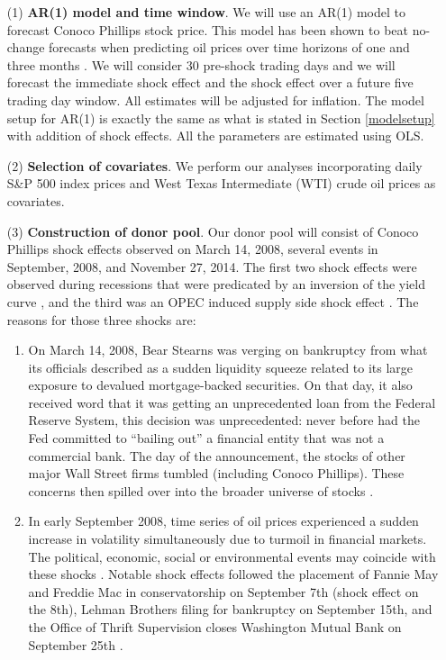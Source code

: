 \documentclass[11pt]{article}
\theoremstyle{definition}
\begin{document}
\begin{enumerate}
\item[(1)] {\bf AR(1) model and time window}. We will use an AR(1) model to forecast Conoco Phillips stock price. This model has been shown to beat no-change forecasts when predicting oil prices over time horizons of one and three months \citep{alquist2013forecasting}. We will consider 30 pre-shock trading days and we will forecast the immediate shock effect and the shock effect over a future five trading day window. All estimates will be adjusted for inflation. The model setup for AR(1) is exactly the same as what is stated in Section \ref{modelsetup} with addition of shock effects. All the parameters are estimated using OLS.
\item[(2)] {\bf Selection of covariates}. We perform our analyses incorporating daily S\&P 500 index prices and West Texas Intermediate (WTI) crude oil prices as covariates. 
\item[(3)] {\bf Construction of donor pool}. Our donor pool will consist of Conoco Phillips shock effects observed on March 14, 2008, several events in September, 2008, and November 27, 2014. The first two shock effects were observed during recessions that were predicated by an inversion of the yield curve \citep{bauer2018economic}, and the third was an OPEC induced supply side shock effect \citep{huppmann2015opec}. The reasons for those three shocks are:
  \begin{enumerate}
  \item On March 14, 2008, Bear Stearns was verging on bankruptcy from what its officials described as a sudden liquidity squeeze related to its large exposure to devalued mortgage-backed securities. On that day, it also received word that it was getting an unprecedented loan from the Federal Reserve System, this decision was unprecedented: never before had the Fed committed to ``bailing out'' a financial entity that was not a commercial bank. The day of the announcement, the stocks of other major Wall Street firms tumbled (including Conoco Phillips). These concerns then spilled over into the broader universe of stocks \citep{shorter2008bear}. %
  \item  In early September 2008, time series of oil prices experienced a sudden increase in volatility simultaneously due to turmoil in financial markets. The political, economic, social or environmental events may coincide with these shocks \citep{ewing2013volatility}. Notable shock effects followed the placement of Fannie May and Freddie Mac in conservatorship on September 7th (shock effect on the 8th), Lehman Brothers filing for bankruptcy on September 15th, and the Office of Thrift Supervision closes Washington Mutual Bank on September 25th \citep{dwyer2009financial, longstaff2010subprime}.

\end{enumerate}
\end{enumerate}
\end{document}

